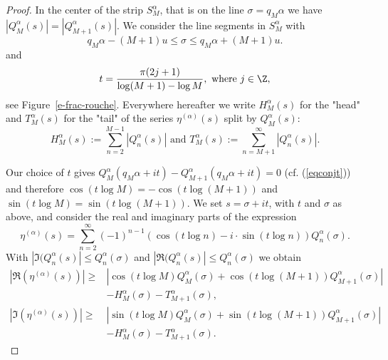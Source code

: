 \documentclass{amsart}
\theoremstyle{plain}
\theoremstyle{definition}
\newcommand{\etalpha}{\eta^{(\alpha)}}
\newcommand{\mc}{u}
\newcommand{\ourref}[2]{#1~\ref{#2}}
\begin{document}
\begin{proof}
In the center of the strip $S_M^\alpha$, that is on the line $\sigma=q_M\alpha$ we have $|Q_M^\alpha(s)|=|Q_{M+1}^\alpha(s)|$.
We consider the line segments in $S_M^\alpha$ with
\[
q_M \alpha-(M+1)\mc\le \sigma \le q_M \alpha+(M+1)\mc.
\]
and
\[
t=\frac{\pi (2j+1)}{\log(M+1)-\log M}, \mbox{ where }j\in\Z,
\]
see \ourref{Figure}{e-frac-rouche}. Everywhere hereafter we write $H_M^{\alpha}(s)$ for the "head" and $T_M^{\alpha}(s)$ for the "tail" of the series $\etalpha(s)$ split by $Q_M^{\alpha}(s)$:
\[H_M^{\alpha}(s) := \sum_{n=2}^{M-1}|Q_n^{\alpha}(s)|
\text{ and }
    T_M^{\alpha}(s):= \sum_{n=M+1}^{\infty}|Q_n^{\alpha}(s)|. %
\]


Our choice of $t$ gives $Q_M^\alpha(q_M \alpha+it)-Q_{M+1}^\alpha(q_M \alpha+it)=0$ (cf. (\ref{eqconjt})) 
and therefore $\cos(t\log M)=-\cos(t\log(M+1))$ and $\sin(t\log M)=\sin(t\log(M+1))$.
We set $s=\sigma+it$, with $t$ and $\sigma$ as above, and consider the real and imaginary parts of the expression
\[
\etalpha(s)=\sum_{n=2}^\infty (-1)^{n-1}\left(\cos(t\log n)-i\cdot\sin(t\log n)\right)Q_n^\alpha(\sigma).
\]
With $|\Im(Q_{n}^\alpha(s)|\le Q_n^\alpha(\sigma)$ and $|\Re(Q_{n}^\alpha(s)|\le Q_n^\alpha(\sigma)$ we obtain
\begin{align*}
|\Re(\etalpha(s))|\ge& |\cos(t\log M)Q_M^\alpha(\sigma)+\cos(t\log(M+1))Q_{M+1}^\alpha(\sigma)|\\&-H_M^\alpha(\sigma)-T_{M+1}^\alpha(\sigma),\\
|\Im(\etalpha(s))|\ge& |\sin(t\log M)Q_M^\alpha(\sigma)+\sin(t\log(M+1))Q_{M+1}^\alpha(\sigma)|\\&-H_M^\alpha(\sigma)-T_{M+1}^\alpha(\sigma).
\end{align*}


\end{proof}
\end{document}
